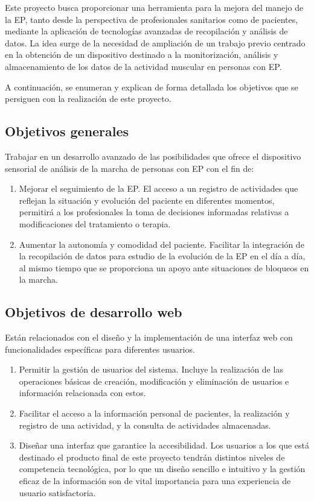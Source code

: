 
Este proyecto busca proporcionar una herramienta para la mejora del manejo de la EP, tanto desde la perspectiva de profesionales sanitarios como de pacientes, mediante la aplicación de tecnologías avanzadas de recopilación y análisis de datos. La idea surge de la necesidad de ampliación de un trabajo previo centrado en la obtención de un dispositivo destinado a la monitorización, análisis y almacenamiento de los datos de la actividad muscular en personas con EP. 

A continuación, se enumeran y explican de forma detallada los objetivos que se persiguen con la realización de este proyecto.

\subsection{Objetivos generales }
Trabajar en un desarrollo avanzado de las posibilidades que ofrece el dispositivo sensorial de análisis de la marcha de personas con EP con el fin de:
\begin{enumerate}
    \item Mejorar el seguimiento de la EP. El acceso a un registro de actividades que reflejan la situación y evolución del paciente en diferentes momentos, permitirá a los profesionales la toma de decisiones informadas relativas a modificaciones del tratamiento o terapia.
    \item Aumentar la autonomía y comodidad del paciente. Facilitar la integración de la recopilación de datos para estudio de la evolución de la EP en el día a día, al mismo tiempo que se proporciona un apoyo ante situaciones de bloqueos en la marcha.
\end{enumerate}

\subsection{Objetivos de desarrollo web}
Están relacionados con el diseño y la implementación de una interfaz web con funcionalidades específicas para diferentes usuarios. 
\begin{enumerate}
    \item Permitir la gestión de usuarios del sistema. Incluye la realización de las operaciones básicas de creación, modificación y eliminación de usuarios e información relacionada con estos.
    \item Facilitar el acceso a la información personal de pacientes, la realización y registro de una actividad, y la consulta de actividades almacenadas.
    \item Diseñar una interfaz que garantice la accesibilidad. Los usuarios a los que está destinado el producto final de este proyecto tendrán distintos niveles de competencia tecnológica, por lo que un diseño sencillo e intuitivo y la gestión eficaz de la información son de vital importancia para una experiencia de usuario satisfactoria.
\end{enumerate}

